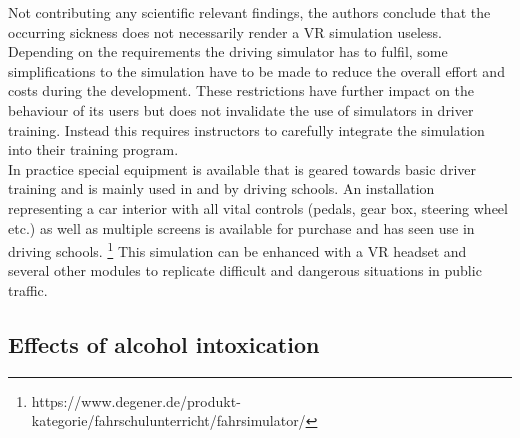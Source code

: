 Not contributing any scientific relevant findings, the authors conclude that the occurring sickness does not necessarily render a VR simulation useless.
\\
Depending on the requirements the driving simulator has to fulfil, some simplifications to the simulation have to be made to reduce the overall effort and costs during the development. 
These restrictions have further impact on the behaviour of its users but does not invalidate the use of simulators in driver training.  
Instead this requires instructors to carefully integrate the simulation into their training program. \autocite[3]{leitao1999evaluation} 
\\
In practice special equipment is available that is geared towards basic driver training and is mainly used in and by driving schools. 
An installation representing a car interior with all vital controls (pedals, gear box, steering wheel etc.) as well as multiple screens is available for purchase and has seen use in driving schools. \footnote{https://www.degener.de/produkt-kategorie/fahrschulunterricht/fahrsimulator/}
This simulation can be enhanced with a VR headset and several other modules to replicate difficult and dangerous situations in public traffic. 
\\


%
\subsection{Effects of alcohol intoxication}
\label{subsection:effects of alcohol}
%

